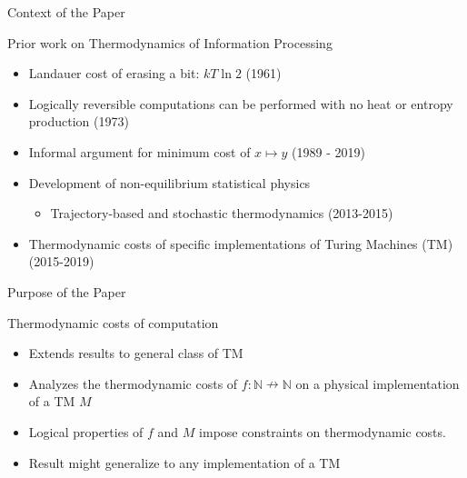 
\begin{frame}{Context of the Paper}
\begin{block}{Prior work on Thermodynamics of Information Processing}
\begin{itemize}
    \item Landauer cost of erasing a bit: $kT\ln2$ (1961)
    \item Logically reversible computations can be performed with no heat or entropy production (1973)
    \item Informal argument for minimum cost of $x\mapsto y$ (1989 - 2019)
    \item Development of non-equilibrium statistical physics
    \begin{itemize}
        \item Trajectory-based and stochastic thermodynamics (2013-2015)
    \end{itemize}
    \item Thermodynamic costs of specific implementations of Turing Machines (TM)(2015-2019)
    
    
\end{itemize}
\end{block}
\end{frame}


\begin{frame}{Purpose of the Paper}
    \begin{block}{Thermodynamic costs of computation}
    \begin{itemize}
        \item Extends results to general class of TM
        \item Analyzes the thermodynamic costs of $f:\mathbb{N} \nrightarrow \mathbb{N}$ on a physical implementation of a TM $M$
        \item Logical properties of $f$ and $M$ impose constraints on thermodynamic costs.
        \item Result might generalize to any implementation of a TM
        
    \end{itemize}
    \end{block}
\end{frame}